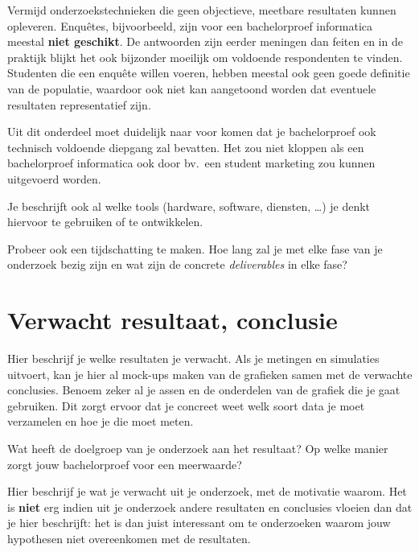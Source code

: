 Vermijd onderzoekstechnieken die geen objectieve, meetbare resultaten kunnen opleveren. Enquêtes, bijvoorbeeld, zijn voor een bachelorproef informatica meestal \textbf{niet geschikt}. De antwoorden zijn eerder meningen dan feiten en in de praktijk blijkt het ook bijzonder moeilijk om voldoende respondenten te vinden. Studenten die een enquête willen voeren, hebben meestal ook geen goede definitie van de populatie, waardoor ook niet kan aangetoond worden dat eventuele resultaten representatief zijn.

Uit dit onderdeel moet duidelijk naar voor komen dat je bachelorproef ook technisch voldoen\-de diepgang zal bevatten. Het zou niet kloppen als een bachelorproef informatica ook door bv.\ een student marketing zou kunnen uitgevoerd worden.

Je beschrijft ook al welke tools (hardware, software, diensten, \ldots) je denkt hiervoor te gebruiken of te ontwikkelen.

Probeer ook een tijdschatting te maken. Hoe lang zal je met elke fase van je onderzoek bezig zijn en wat zijn de concrete \emph{deliverables} in elke fase?

\section{Verwacht resultaat, conclusie}%
\label{sec:verwachte_resultaten}

Hier beschrijf je welke resultaten je verwacht. Als je metingen en simulaties uitvoert, kan je hier al mock-ups maken van de grafieken samen met de verwachte conclusies. Benoem zeker al je assen en de onderdelen van de grafiek die je gaat gebruiken. Dit zorgt ervoor dat je concreet weet welk soort data je moet verzamelen en hoe je die moet meten.

Wat heeft de doelgroep van je onderzoek aan het resultaat? Op welke manier zorgt jouw bachelorproef voor een meerwaarde?

Hier beschrijf je wat je verwacht uit je onderzoek, met de motivatie waarom. Het is \textbf{niet} erg indien uit je onderzoek andere resultaten en conclusies vloeien dan dat je hier beschrijft: het is dan juist interessant om te onderzoeken waarom jouw hypothesen niet overeenkomen met de resultaten.

